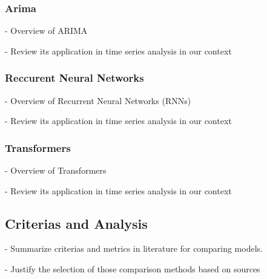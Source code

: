 \documentclass[12pt, letterpaper]{article}
\begin{document}
    \subsubsection*{Arima}
    - Overview of ARIMA 

    - Review its application in time series analysis in our context
    \subsubsection*{Reccurent Neural Networks}
    - Overview of Recurrent Neural Networks (RNNs)

    - Review its application in time series analysis in our context
    \subsubsection*{Transformers}
    - Overview of Transformers

    - Review its application in time series analysis in our context


\subsection*{Criterias and Analysis}
- Summarize criterias and metrics in literature for comparing models.

- Justify the selection of those comparison methods based on sources
\end{document}
